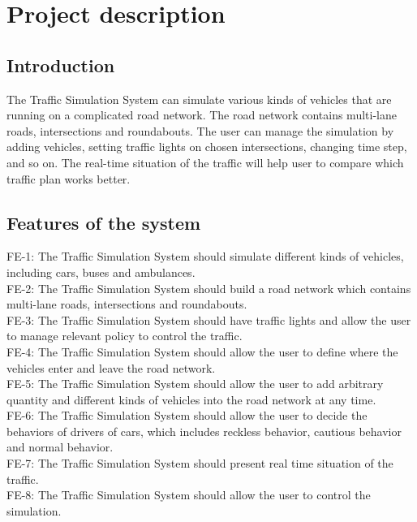 \documentclass[a4paper,12pt]{article}
\begin{document}
\section{Project description}
\subsection{Introduction}
The Traffic Simulation System can simulate various kinds of vehicles that are running on a complicated road network. The road network contains multi-lane roads, intersections and roundabouts. The user can manage the simulation by adding vehicles, setting traffic lights on chosen intersections, changing time step, and so on. The real-time situation of the traffic will help user to compare which traffic plan works better.

\subsection{Features of the system}
FE-1: The Traffic Simulation System should simulate different kinds of vehicles, including cars, buses and ambulances.\\
FE-2: The Traffic Simulation System should build a road network which contains multi-lane roads, intersections and roundabouts.\\
FE-3: The Traffic Simulation System should have traffic lights and allow the user to manage relevant policy to control the traffic.\\
FE-4: The Traffic Simulation System should allow the user to define where the vehicles enter and leave the road network.\\
FE-5: The Traffic Simulation System should allow the user to add arbitrary quantity and different kinds of vehicles into the road network at any time.\\
FE-6: The Traffic Simulation System should allow the user to decide the behaviors of drivers of cars, which includes reckless behavior, cautious behavior and normal behavior.\\
FE-7: The Traffic Simulation System should present real time situation of the traffic.\\
FE-8: The Traffic Simulation System should allow the user to control the simulation.\\
\end{document}
